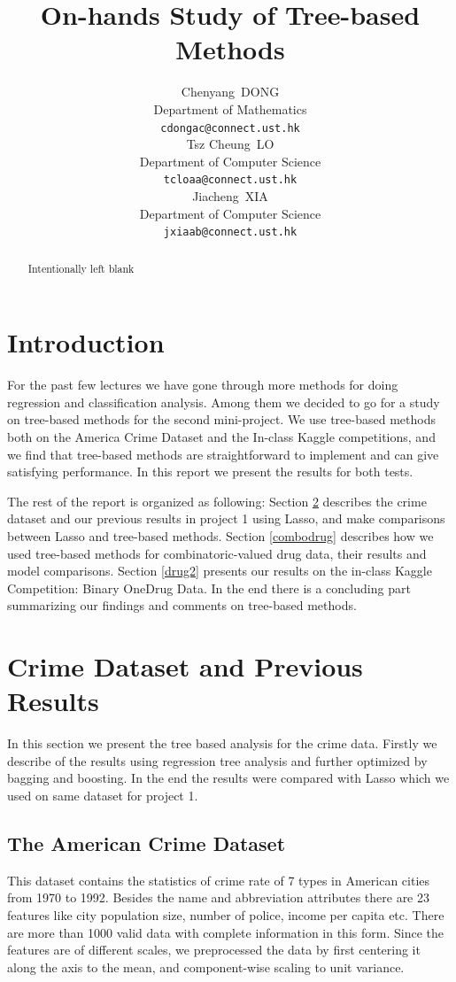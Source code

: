 \documentclass{article}
\title{On-hands Study of Tree-based Methods}
\author{
  Chenyang~DONG\\
  Department of Mathematics\\
  \texttt{cdongac@connect.ust.hk} \\
  \And
  Tsz Cheung~LO\\
   Department of Computer Science\\
  \texttt{tcloaa@connect.ust.hk} \\
  \And
  Jiacheng~XIA\\
   Department of Computer Science\\
  \texttt{jxiaab@connect.ust.hk} \\
}
\begin{document}

\maketitle

\begin{abstract}
Intentionally left blank
\end{abstract}

\section{Introduction}

For the past few lectures we have gone through more methods for doing regression and classification analysis. Among them we decided to go for a study on tree-based methods for the second mini-project. We use tree-based methods both on the America Crime Dataset and the In-class Kaggle competitions, and we find that tree-based methods are straightforward to implement and can give satisfying performance. In this report we present the results for both tests.

The rest of the report is organized as following: Section \ref{crime-Lasso} describes the crime dataset and our previous results in project 1 using Lasso, and make comparisons between Lasso and tree-based methods. Section \ref{combodrug} describes how we used tree-based methods for combinatoric-valued drug data, their results and model comparisons. Section \ref{drug2} presents our results on the in-class Kaggle Competition: Binary OneDrug Data. In the end there is a concluding part summarizing our findings and comments on tree-based methods.

\section{Crime Dataset and Previous Results}
\label{crime-Lasso}
In this section we present the tree based analysis for the crime data. Firstly we describe of the results using regression tree analysis and further optimized by bagging and boosting. In the end the results were compared with Lasso which we used on same dataset for project 1.

\subsection{The American Crime Dataset}
\label{crime_data}
This dataset contains the statistics of crime rate of 7 types in American cities from 1970 to 1992. Besides the name and abbreviation attributes there are 23 features like city population size, number of police, income per capita etc. There are more than 1000 valid data with complete information in this form. Since the features are of different scales, we preprocessed the data by first centering it along the axis to the mean, and component-wise scaling to unit variance.
\end{document}

